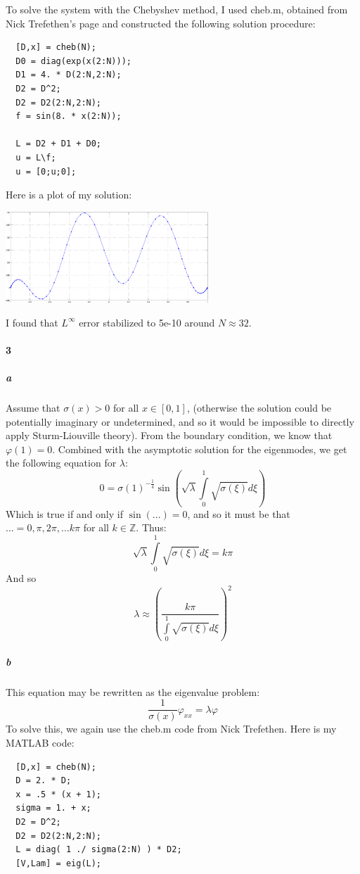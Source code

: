 \documentclass{article}
\begin{document}
To solve the system with the Chebyshev method, I used cheb.m, obtained from Nick Trefethen's page and constructed the following solution procedure:

\begin{verbatim}
  [D,x] = cheb(N);        
  D0 = diag(exp(x(2:N)));
  D1 = 4. * D(2:N,2:N);
  D2 = D^2;              
  D2 = D2(2:N,2:N);
  f = sin(8. * x(2:N));
  
  L = D2 + D1 + D0;  
  u = L\f;
  u = [0;u;0];
\end{verbatim}            
  
Here is a plot of my solution:

\includegraphics[width=3in]{plot2_matlab.png}

I found that $L^\infty$ error stabilized to 5e-10 around $N \approx 32$.

\paragraph{3}

\subparagraph{a}

Assume that $\sigma(x) > 0$ for all $x \in [0,1]$, (otherwise the solution could be potentially imaginary or undetermined, and so it would be impossible to directly apply Sturm-Liouville theory).  From the boundary condition, we know that $\varphi(1) = 0$.  Combined with the asymptotic solution for the eigenmodes, we get the following equation for $\lambda$:
\[ 0 = \sigma(1)^{-\frac{1}{4}} \sin \left( \sqrt{ \lambda } \int \limits_0^1 \sqrt{ \sigma(\xi) } d \xi \right) \]
Which is true if and only if $\sin(...) = 0$, and so it must be that $... = 0, \pi, 2\pi, ... k \pi$ for all $k \in \mathbb{Z}$.  Thus:
\[ \sqrt{\lambda} \int \limits_0^1 \sqrt{\sigma(\xi)} d \xi = k \pi \]
And so
\[ \lambda \approx \left( \frac{k \pi}{ \int \limits_0^1 \sqrt{ \sigma(\xi) } d \xi } \right) ^2 \]

\subparagraph{b}

This equation may be rewritten as the eigenvalue problem:
\[ \frac{1}{\sigma(x)} \varphi_{xx} = \lambda \varphi \]
To solve this, we again use the cheb.m code from Nick Trefethen.  Here is my MATLAB code:
\begin{verbatim}
  [D,x] = cheb(N);
  D = 2. * D;
  x = .5 * (x + 1);
  sigma = 1. + x;
  D2 = D^2; 
  D2 = D2(2:N,2:N);
  L = diag( 1 ./ sigma(2:N) ) * D2; 
  [V,Lam] = eig(L); 
\end{verbatim}
\end{document}
